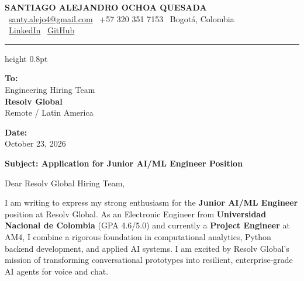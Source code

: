 \documentclass[11pt,a4paper]{article}
\begin{document}
\thispagestyle{empty}
\color{darktext}

\begin{center}
    {\Huge \bfseries\color{accent} SANTIAGO ALEJANDRO OCHOA QUESADA} \\[6pt]
    {\small\color{darktext}
    \faEnvelope\ \href{mailto:santy.alejo4@gmail.com}{santy.alejo4@gmail.com}
    \quad\textcolor{bulletline}{\textbar}\quad
    \faPhone\ +57 320 351 7153
    \quad\textcolor{bulletline}{\textbar}\quad
    \faMapMarker*\ Bogotá, Colombia \\[4pt]
    \faLinkedin\ \href{https://linkedin.com/in/santiago-alejandro-ochoa-quesada-a07a18288/}{LinkedIn}
    \quad\textcolor{bulletline}{\textbar}\quad
    \faGithub\ \href{https://github.com/Sochoaq}{GitHub}
    }
\end{center}
\vspace{2pt}
{\color{bulletline}\hrule height 0.8pt}
\vspace{10pt}

\noindent
\begin{minipage}[t]{0.62\textwidth}
    \textbf{\color{accent} To:}\\
    Engineering Hiring Team\\
    \textbf{Resolv Global}\\
    Remote / Latin America
\end{minipage}
\hfill
\begin{minipage}[t]{0.35\textwidth}\raggedleft
    \textbf{\color{accent} Date:}\\
    October 23, 2026
\end{minipage}

\vspace{6pt}
\noindent
{\large\bfseries\color{accent} Subject: Application for Junior AI/ML Engineer Position}
\vspace{2pt}

\noindent Dear Resolv Global Hiring Team,

I am writing to express my strong enthusiasm for the \textbf{Junior AI/ML Engineer} position at Resolv Global. As an Electronic Engineer from \textbf{Universidad Nacional de Colombia} (GPA 4.6/5.0) and currently a \textbf{Project Engineer} at AM4, I combine a rigorous foundation in computational analytics, Python backend development, and applied AI systems. I am excited by Resolv Global's mission of transforming conversational prototypes into resilient, enterprise-grade AI agents for voice and chat.
\end{document}
